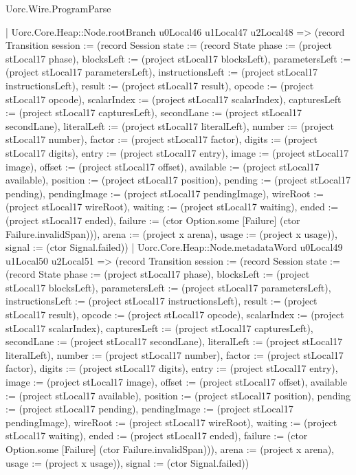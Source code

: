 \begin{lexlean}{Uorc.Wire.ProgramParse}
\begin{semanticmodule}
{          | Uorc.Core.Heap::Node.rootBranch u0Local46 u1Local47 u2Local48 => (record Transition {session := (record Session {state := (record State {phase := (project stLocal17 phase), blocksLeft := (project stLocal17 blocksLeft), parametersLeft := (project stLocal17 parametersLeft), instructionsLeft := (project stLocal17 instructionsLeft), result := (project stLocal17 result), opcode := (project stLocal17 opcode), scalarIndex := (project stLocal17 scalarIndex), capturesLeft := (project stLocal17 capturesLeft), secondLane := (project stLocal17 secondLane), literalLeft := (project stLocal17 literalLeft), number := (project stLocal17 number), factor := (project stLocal17 factor), digits := (project stLocal17 digits), entry := (project stLocal17 entry), image := (project stLocal17 image), offset := (project stLocal17 offset), available := (project stLocal17 available), position := (project stLocal17 position), pending := (project stLocal17 pending), pendingImage := (project stLocal17 pendingImage), wireRoot := (project stLocal17 wireRoot), waiting := (project stLocal17 waiting), ended := (project stLocal17 ended), failure := (ctor Option.some [Failure] (ctor Failure.invalidSpan))}), arena := (project x arena), usage := (project x usage)}), signal := (ctor Signal.failed)})
          | Uorc.Core.Heap::Node.metadataWord u0Local49 u1Local50 u2Local51 => (record Transition {session := (record Session {state := (record State {phase := (project stLocal17 phase), blocksLeft := (project stLocal17 blocksLeft), parametersLeft := (project stLocal17 parametersLeft), instructionsLeft := (project stLocal17 instructionsLeft), result := (project stLocal17 result), opcode := (project stLocal17 opcode), scalarIndex := (project stLocal17 scalarIndex), capturesLeft := (project stLocal17 capturesLeft), secondLane := (project stLocal17 secondLane), literalLeft := (project stLocal17 literalLeft), number := (project stLocal17 number), factor := (project stLocal17 factor), digits := (project stLocal17 digits), entry := (project stLocal17 entry), image := (project stLocal17 image), offset := (project stLocal17 offset), available := (project stLocal17 available), position := (project stLocal17 position), pending := (project stLocal17 pending), pendingImage := (project stLocal17 pendingImage), wireRoot := (project stLocal17 wireRoot), waiting := (project stLocal17 waiting), ended := (project stLocal17 ended), failure := (ctor Option.some [Failure] (ctor Failure.invalidSpan))}), arena := (project x arena), usage := (project x usage)}), signal := (ctor Signal.failed)})
}
\end{semanticmodule}
\end{lexlean}
